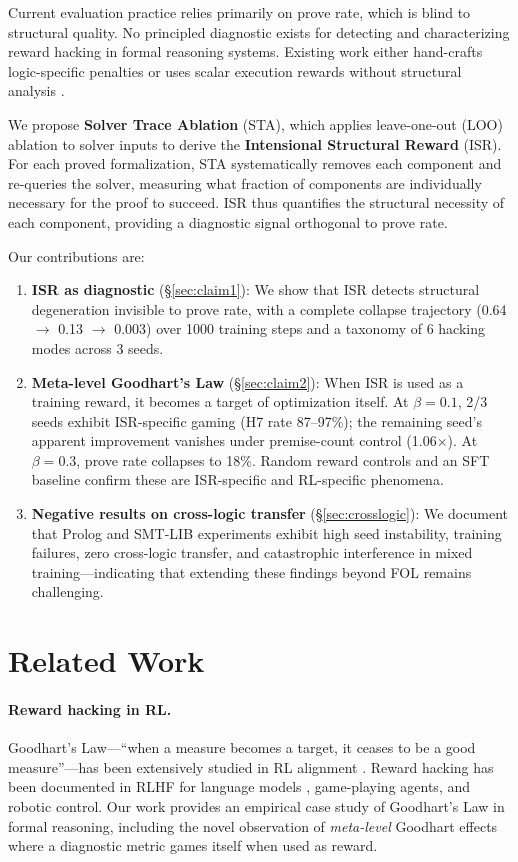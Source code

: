 \documentclass[11pt,a4paper]{article}
\newcommand{\ISR}{\textsc{ISR}}
\newcommand{\STA}{\textsc{STA}}
\begin{document}
Current evaluation practice relies primarily on prove rate, which is blind to structural quality.
No principled diagnostic exists for detecting and characterizing reward hacking in formal reasoning systems.
Existing work either hand-crafts logic-specific penalties \cite{mellgren2025} or uses scalar execution rewards without structural analysis \cite{evom2026}.

We propose \textbf{Solver Trace Ablation} (\STA{}), which applies leave-one-out (LOO) ablation to solver inputs to derive the \textbf{Intensional Structural Reward} (\ISR{}).
For each proved formalization, \STA{} systematically removes each component and re-queries the solver, measuring what fraction of components are individually necessary for the proof to succeed.
\ISR{} thus quantifies the structural necessity of each component, providing a diagnostic signal orthogonal to prove rate.

Our contributions are:
\begin{enumerate}
\item \textbf{\ISR{} as diagnostic} (\S\ref{sec:claim1}): We show that \ISR{} detects structural degeneration invisible to prove rate, with a complete collapse trajectory (0.64 $\to$ 0.13 $\to$ 0.003) over 1000 training steps and a taxonomy of 6 hacking modes across 3 seeds.
\item \textbf{Meta-level Goodhart's Law} (\S\ref{sec:claim2}): When \ISR{} is used as a training reward, it becomes a target of optimization itself. At $\beta{=}0.1$, 2/3 seeds exhibit ISR-specific gaming (H7 rate 87--97\%); the remaining seed's apparent improvement vanishes under premise-count control (1.06$\times$). At $\beta{=}0.3$, prove rate collapses to 18\%. Random reward controls and an SFT baseline confirm these are ISR-specific and RL-specific phenomena.
\item \textbf{Negative results on cross-logic transfer} (\S\ref{sec:crosslogic}): We document that Prolog and SMT-LIB experiments exhibit high seed instability, training failures, zero cross-logic transfer, and catastrophic interference in mixed training---indicating that extending these findings beyond FOL remains challenging.
\end{enumerate}

\section{Related Work}

\paragraph{Reward hacking in RL.}
Goodhart's Law---``when a measure becomes a target, it ceases to be a good measure''---has been extensively studied in RL alignment \cite{manheim2019categorizing}.
Reward hacking has been documented in RLHF for language models \cite{gao2023scaling}, game-playing agents, and robotic control.
Our work provides an empirical case study of Goodhart's Law in formal reasoning, including the novel observation of \emph{meta-level} Goodhart effects where a diagnostic metric games itself when used as reward.
\end{document}

